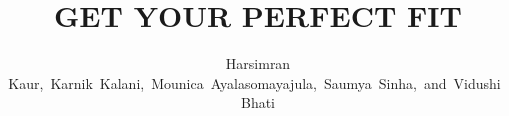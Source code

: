 \documentclass[11pt,journal,compsoc]{IEEEtran}
\begin{document}
%
\title{GET YOUR PERFECT FIT}
%
%
%
%

\author{Harsimran Kaur,~Karnik~Kalani,~Mounica~Ayalasomayajula,~Saumya~Sinha,~and~Vidushi~Bhati}%
\end{document}
